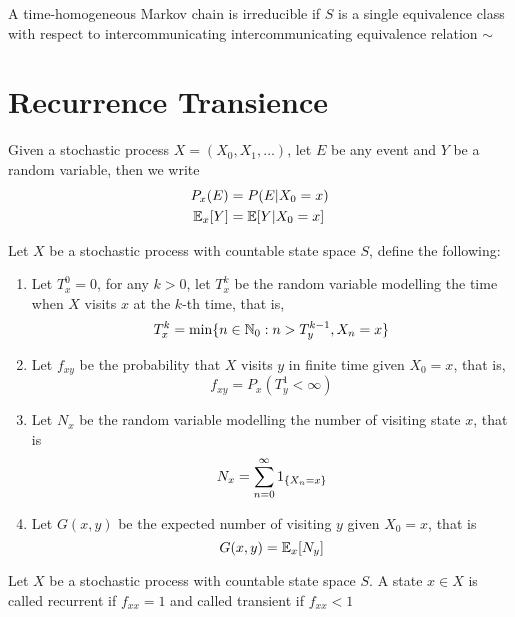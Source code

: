 \documentclass{report}
\begin{document}
\begin{definition}
    A time-homogeneous Markov chain is irreducible if $S$ is a single equivalence class with respect to intercommunicating intercommunicating equivalence relation $\sim$
\end{definition}

\section{Recurrence Transience}

\begin{remark}[notation]
	Given a stochastic process $X = (X_0, X_1, ...)$, let $E$ be any event and $Y$ be a random variable, then we write
	\begin{align*}
		P_x(E) &= P(E | X_0 = x) \\
		\mathbb{E}_x[Y] &= \mathbb{E}[Y | X_0 = x]
	\end{align*}
\end{remark}

\begin{definition}[$T_x^k$, $f_{xy}$, $N_x$, $G(x, y)$]
    Let $X$ be a stochastic process with countable state space $S$, define the following:
    \begin{enumerate}
    	\item Let $T_x^0 = 0$, for any $k > 0$, let $T_x^k$ be the random variable modelling the time when $X$ visits $x$ at the $k$-th time, that is,
    	$$
    		T_x^k = \min \{n \in \mathbb{N}_0: n > T_y^{k-1}, X_n = x\}
    	$$
    	
    	\item Let $f_{xy}$ be the probability that $X$ visits $y$ in finite time given $X_0 = x$, that is,
    	$$
    		f_{xy} = P_x(T_y^1 < \infty)
    	$$
    	
    	\item Let $N_x$ be the random variable modelling the number of visiting state $x$, that is
    	$$
    		N_x = \sum_{n=0}^\infty 1_{\{X_n = x\}}
    	$$
    	
    	\item Let $G(x, y)$ be the expected number of visiting $y$ given $X_0 = x$, that is
    	$$
    		G(x, y) = \mathbb{E}_x[N_y]
    	$$
    \end{enumerate}
\end{definition}

\begin{definition}
    Let $X$ be a stochastic process with countable state space $S$. A state $x \in X$ is called recurrent if $f_{xx} = 1$ and called transient if $f_{xx} < 1$
\end{definition}
\end{document}
